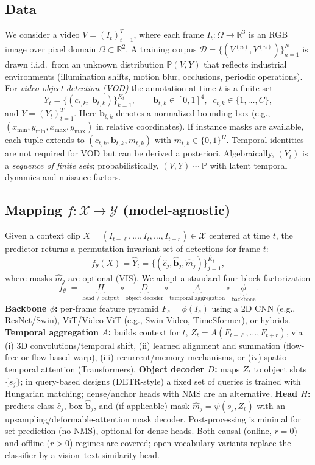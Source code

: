 \documentclass{article}
\begin{document}
\subsection{Data}
We consider a video $V=(I_t)_{t=1}^{T}$, where each frame $I_t:\Omega\!\to\!\mathbb{R}^3$ is an RGB image over pixel domain $\Omega\subset\mathbb{R}^2$. A training corpus $\mathcal{D}=\{(V^{(n)},Y^{(n)})\}_{n=1}^{N}$ is drawn i.i.d.\ from an unknown distribution $\mathbb{P}(V,Y)$ that reflects industrial environments (illumination shifts, motion blur, occlusions, periodic operations).
For \emph{video object detection (VOD)} the annotation at time $t$ is a finite set
\[
Y_t=\{(c_{t,k},\,\mathbf{b}_{t,k})\}_{k=1}^{K_t},\qquad
\mathbf{b}_{t,k}\in[0,1]^4,\;\; c_{t,k}\in\{1,\dots,C\},
\]
and $Y=(Y_t)_{t=1}^{T}$. Here $\mathbf{b}_{t,k}$ denotes a normalized bounding box (e.g., $(x_\text{min},y_\text{min},x_\text{max},y_\text{max})$ in relative coordinates). If instance masks are available, each tuple extends to $(c_{t,k},\mathbf{b}_{t,k},m_{t,k})$ with $m_{t,k}\in\{0,1\}^{\Omega}$. Temporal identities are not required for VOD but can be derived a posteriori. Algebraically, $(Y_t)$ is a \emph{sequence of finite sets}; probabilistically, $(V,Y)\sim\mathbb{P}$ with latent temporal dynamics and nuisance factors.

\subsection{Mapping $f:\mathcal{X}\to\mathcal{Y}$ (model-agnostic)}
Given a context clip $X=(I_{t-\ell},\dots,I_t,\dots,I_{t+r})\in\mathcal{X}$ centered at time $t$, the predictor returns a permutation-invariant set of detections for frame $t$:
\[
f_\theta(X)=\hat{Y}_t=\{(\hat c_j,\hat{\mathbf{b}}_j,\hat m_j)\}_{j=1}^{\hat K_t},
\]
where masks $\hat m_j$ are optional (VIS). We adopt a standard four-block factorization
\[
f_\theta \;=\; \underbrace{H}_{\text{head / output}}
\circ \underbrace{D}_{\text{object decoder}}
\circ \underbrace{A}_{\text{temporal aggregation}}
\circ \underbrace{\phi}_{\text{backbone}}.
\]
\textbf{Backbone $\phi$:} per-frame feature pyramid $F_s=\phi(I_s)$ using a 2D CNN (e.g., ResNet/Swin), ViT/Video-ViT (e.g., Swin-Video, TimeSformer), or hybrids.
\textbf{Temporal aggregation $A$:} builds context for $t$,
$Z_t = A(F_{t-\ell},\dots,F_{t+r})$, via (i) 3D convolutions/temporal shift, (ii) learned alignment and summation (flow-free or flow-based warp), (iii) recurrent/memory mechanisms, or (iv) spatio-temporal attention (Transformers).
\textbf{Object decoder $D$:} maps $Z_t$ to object slots $\{s_j\}$; in query-based designs (DETR-style) a fixed set of queries is trained with Hungarian matching; dense/anchor heads with NMS are an alternative.
\textbf{Head $H$:} predicts class $\hat c_j$, box $\hat{\mathbf{b}}_j$, and (if applicable) mask $\hat m_j=\psi(s_j,Z_t)$ with an upsampling/deformable-attention mask decoder. Post-processing is minimal for set-prediction (no NMS), optional for dense heads. Both causal (online, $r{=}0$) and offline ($r{>}0$) regimes are covered; open-vocabulary variants replace the classifier by a vision–text similarity head.
\end{document}
